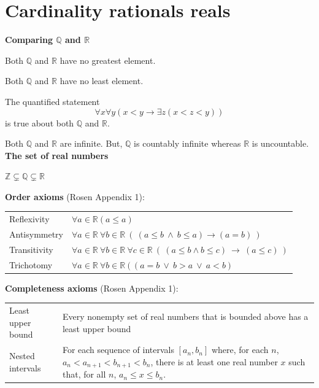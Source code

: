 \documentclass[12pt, oneside]{article}
\begin{document}
\begin{flushright}
\end{flushright} \section*{Cardinality rationals reals}


{\bf Comparing $\mathbb{Q}$ and $\mathbb{R}$} 


Both $\mathbb{Q}$ and $\mathbb{R}$ have no greatest element.

Both $\mathbb{Q}$ and $\mathbb{R}$ have no least element.

The quantified statement 
\[
    \forall x \forall y (x < y \to \exists z ( x < z < y) )
\]
is true about both $\mathbb{Q}$ and $\mathbb{R}$.

Both $\mathbb{Q}$ and $\mathbb{R}$ are infinite. But, $\mathbb{Q}$ is countably infinite
whereas $\mathbb{R}$ is uncountable.\\


{\bf The set of real numbers}

$\mathbb{Z} \subsetneq \mathbb{Q} \subsetneq \mathbb{R}$


{\bf  Order axioms} (Rosen Appendix 1): 

\begin{center}
\begin{tabular}{p{1.2in}p{4in}}
Reflexivity &  $\forall a \in  \mathbb{R} (a \leq a)$\\
Antisymmetry &  $\forall a \in  \mathbb{R}~\forall b \in \mathbb{R}~(~(a \leq b~ \wedge ~b \leq a) \to (a=b)~)$\\
Transitivity &  $\forall a \in  \mathbb{R}~\forall b \in \mathbb{R}~\forall c \in \mathbb{R}~
(~(a \leq b \wedge b \leq c) ~\to  ~(a \leq c)~)$ \\
Trichotomy & 
$\forall a \in \mathbb{R}~\forall b \in \mathbb{R}~ ( ~(a=b ~\vee~ b > a ~\vee~ a  < b)  $
\end{tabular}
\end{center}


{\bf  Completeness axioms} (Rosen Appendix 1): 


\begin{center}
\begin{tabular}{p{1.4in}p{6in}}
Least upper bound &  Every nonempty set of real numbers that 
is bounded  above has  a  least upper bound  
\\
Nested intervals &  For each sequence  of intervals  $[a_n , b_n]$
where, for each $n$, $a_n < a_{n+1} < b_{n+1} < b_n$, there
is at least one  real number $x$ such that, for all $n$, 
$a_n \leq x \leq b_n$.\\
\end{tabular}
\end{center}
\end{document}
